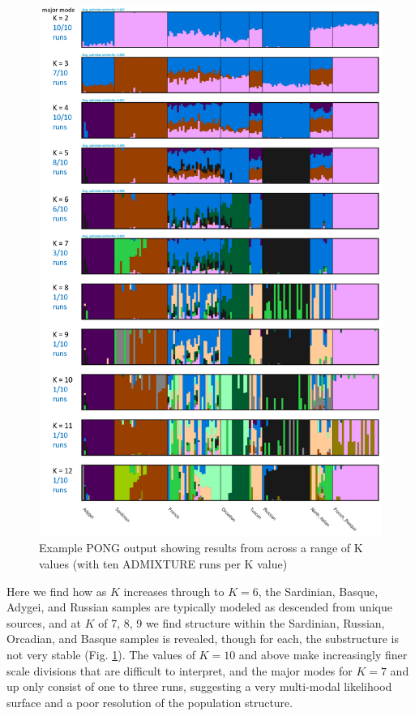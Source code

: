 \documentclass{svmult}       %
\begin{document}
\begin{figure}
\includegraphics[width=1\linewidth]{Figures/Figure5}
 \caption{\label{fig:Fig5}
     Example PONG output showing results from across a range of K values (with ten ADMIXTURE runs per K value)}
\end{figure}

Here we find how as \(K\) increases through to \(K=6\), the Sardinian,
Basque, Adygei, and Russian samples are typically modeled as descended
from unique sources, and at \(K\) of 7, 8, 9 we find structure within
the Sardinian, Russian, Orcadian, and Basque samples is revealed, though
for each, the substructure is not very stable (Fig. \ref{fig:Fig5}). The values of \(K=10\)
and above make increasingly finer scale divisions that are difficult to
interpret, and the major modes for \(K=7\) and up only consist of one to
three runs, suggesting a very multi-modal likelihood surface and a poor
resolution of the population structure.
\end{document}
